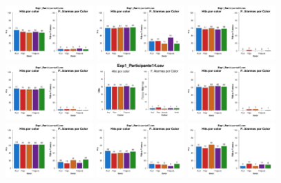 \documentclass[a4paper ]{article}
\begin{document}
\begin{figure}[th]
\includegraphics[width=0.3\textwidth]{Figures/Color_Exp1_P10} \includegraphics[width=0.3\textwidth]{Figures/Color_Exp1_P11} \includegraphics[width=0.3\textwidth]{Figures/Color_Exp1_P12}
\includegraphics[width=0.3\textwidth]{Figures/Color_Exp1_P13} \includegraphics[width=0.3\textwidth]{Figures/Color_Exp1_P14} \includegraphics[width=0.3\textwidth]{Figures/Color_Exp1_P15}
\includegraphics[width=0.3\textwidth]{Figures/Color_Exp1_P16} \includegraphics[width=0.3\textwidth]{Figures/Color_Exp1_P17} \includegraphics[width=0.3\textwidth]{Figures/Color_Exp1_P18}

\end{figure}
\end{document}
